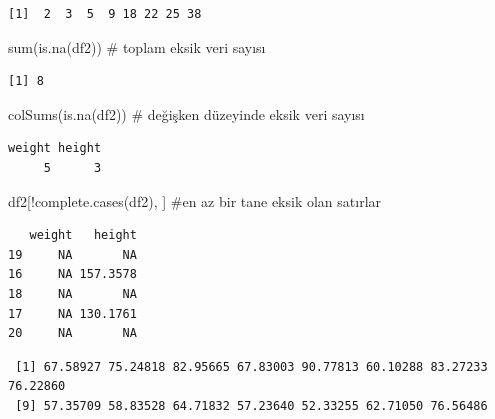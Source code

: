 \documentclass[
  letterpaper,
  DIV=11,
  numbers=noendperiod]{scrreprt}
\newenvironment{Shaded}{\begin{snugshade}}{\end{snugshade}}
\newcommand{\CommentTok}[1]{\textcolor[rgb]{0.37,0.37,0.37}{#1}}
\newcommand{\FunctionTok}[1]{\textcolor[rgb]{0.28,0.35,0.67}{#1}}
\newcommand{\NormalTok}[1]{\textcolor[rgb]{0.00,0.23,0.31}{#1}}
\newcommand{\SpecialCharTok}[1]{\textcolor[rgb]{0.37,0.37,0.37}{#1}}
\begin{document}
\begin{verbatim}
[1]  2  3  5  9 18 22 25 38
\end{verbatim}

\begin{Shaded}
\begin{Highlighting}[]
\FunctionTok{sum}\NormalTok{(}\FunctionTok{is.na}\NormalTok{(df2)) }\CommentTok{\# toplam eksik veri sayısı}
\end{Highlighting}
\end{Shaded}

\begin{verbatim}
[1] 8
\end{verbatim}

\begin{Shaded}
\begin{Highlighting}[]
\FunctionTok{colSums}\NormalTok{(}\FunctionTok{is.na}\NormalTok{(df2)) }\CommentTok{\# değişken düzeyinde eksik veri sayısı}
\end{Highlighting}
\end{Shaded}

\begin{verbatim}
weight height 
     5      3 
\end{verbatim}

\begin{Shaded}
\begin{Highlighting}[]
\NormalTok{df2[}\SpecialCharTok{!}\FunctionTok{complete.cases}\NormalTok{(df2), ] }\CommentTok{\#en az bir tane eksik olan satırlar}
\end{Highlighting}
\end{Shaded}

\begin{verbatim}
   weight   height
19     NA       NA
16     NA 157.3578
18     NA       NA
17     NA 130.1761
20     NA       NA
\end{verbatim}

\begin{Shaded}
\end{Shaded}

\begin{verbatim}
 [1] 67.58927 75.24818 82.95665 67.83003 90.77813 60.10288 83.27233 76.22860
 [9] 57.35709 58.83528 64.71832 57.23640 52.33255 62.71050 76.56486
\end{verbatim}
\end{document}
